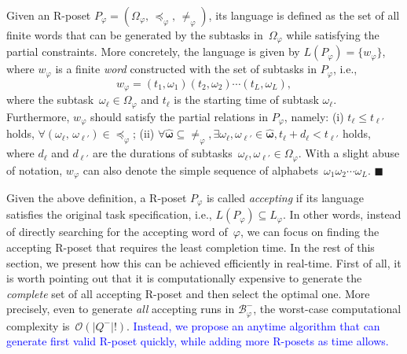 \begin{definition}\label{def:language-poset}
Given an R-poset $P_\varphi=(\Omega_{\varphi}, \, \preceq_{\varphi}, \, \neq_{\varphi})$,
its language is defined as the set of all finite words
that can be generated by the subtasks in~$\Omega_{\varphi}$
while satisfying the partial constraints.
More concretely, the language is given by
$L(P_\varphi)=\{w_{\varphi}\}$, where $w_{\varphi}$ is a finite
\emph{word} constructed with the set of subtasks in $P_\varphi$, i.e.,
\begin{equation}\label{eq:poset-language}
w_{\varphi}=(t_1,\omega_1) (t_2,\omega_2)\cdots (t_L,\omega_L),
\end{equation}
where the subtask~$\omega_\ell \in \Omega_\varphi$ and
$t_\ell$ is the starting time of subtask $\omega_\ell$.
Furthermore, $w_{\varphi}$ should satisfy the partial relations in $P_\varphi$, namely:
(i) $t_\ell \leq t_{\ell'}$ holds,
$\forall (\omega_\ell,\,\omega_{\ell'})\in \preceq_{\varphi}$;
(ii) $\forall \boldsymbol{\hat{\omega}}\subseteq \neq_{\varphi}, 
\exists\omega_{\ell},\omega_{\ell'}\in\boldsymbol{\hat{\omega}}, t_\ell + d_\ell <  t_{\ell'}$ holds,
where $d_\ell$ and $d_{\ell'}$ are the durations of
subtasks~$\omega_\ell, \omega_{\ell'} \in \Omega_{\varphi}$.
With a slight abuse of notation, $w_\varphi$ can also denote the
simple sequence of alphabets~$\omega_1\omega_2\cdots \omega_L$.
\hfill $\blacksquare$
\end{definition}

Given the above definition, a R-poset $P_\varphi$ is called \emph{accepting}
if its language satisfies the original task specification, i.e.,
$L(P_\varphi)\subseteq L_\varphi$.
In other words, instead of directly searching for the accepting word of~$\varphi$,
we can focus on finding the accepting R-poset that
requires the least completion time.
In the rest of this section, we present how this can be achieved efficiently
in real-time.
First of all, it is worth pointing out that it is computationally expensive to
generate the \emph{complete} set of all accepting R-poset
and then select the optimal one.
More precisely, even to generate \emph{all} accepting runs in $\mathcal{B}_{\varphi}^-$,
the worst-case computational complexity is~$\mathcal{O}(|Q^-|!)$.
\textcolor{blue}{Instead, we propose an anytime algorithm that can generate first valid
R-poset quickly, while adding more R-posets as time allows.}

